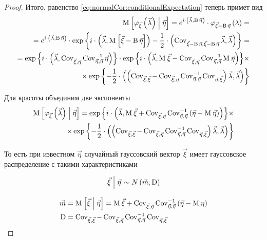 \begin{proof}
  Итого, равенство \ref{eq:normalCor:conditionalExpectation} теперь примет вид
  \begin{align*}
      \Mean{\varphi_{\vec{\xi}}\left( \vec{\lambda} \right) \mcond \vec{\eta}}
      = e^{i \cdot \left( \vec{\lambda}, \operatorname{B} \vec{\eta} \right)}
      \cdot \varphi_{\vec{\xi} - \operatorname{B} \vec{\eta}}\left(
          \lambda \right) = \\
      = e^{i \cdot \left( \vec{\lambda}, \operatorname{B} \vec{\eta} \right)}
      \cdot \exp{\left\{ 
            i \cdot \left( \vec{\lambda},
            \Mean{\vec{\xi} - \operatorname{B} \vec{\eta}} \right)
            - \frac{1}{2} \cdot \left( \dCov{\vec{\xi}
        - \operatorname{B} \vec{\eta}} \vec{\lambda},
        \vec{\lambda} \right)
        \right\}} = \\
      = \exp{\left\{i \cdot \left( \vec{\lambda}, \Cov{\vec{\xi}}{\vec{\eta}}
          \dCov[-1]{\vec{\eta}} \vec{\eta} \right)\right\}}
      \cdot \exp{\left\{ 
            i \cdot \left( \vec{\lambda},
        \mean{\vec{\xi}} - \Cov{\vec{\xi}}{\vec{\eta}}
            \dCov[-1]{\vec{\eta}} \mean{\vec{\eta}} \right)
        \right\}} \times \\
      \times \exp{\left\{ - \frac{1}{2} \cdot \left(
            \left( \dCov{\vec{\xi}} - \Cov{\vec{\xi}}{\vec{\eta}}
        \dCov[-1]{\vec{\eta}} \Cov{\vec{\eta}}{\vec{\xi}}
            \right) \vec{\lambda},
            \vec{\lambda} \right) \right\}}
  \end{align*}

  Для красоты объединим две экспоненты
  \begin{align*}
      \Mean{\varphi_{\vec{\xi}}\left( \vec{\lambda} \right) \mcond \vec{\eta}}
      = \exp{\left\{i \cdot \left( \vec{\lambda},
        \mean{\vec{\xi}} + \Cov{\vec{\xi}}{\vec{\eta}}
            \dCov[-1]{\vec{\eta}} \left(
        \vec{\eta} - \mean{\vec{\eta}} \right) \right)
          \right\}} \times \\
      \times \exp{\left\{- \frac{1}{2} \cdot \left(
            \left( \dCov{\vec{\xi}} - \Cov{\vec{\xi}}{\vec{\eta}}
        \dCov[-1]{\vec{\eta}} \Cov{\vec{\eta}}{\vec{\xi}}
            \right) \vec{\lambda},
            \vec{\lambda} \right)\right\}}
  \end{align*}

  То есть при известном $\vec{\eta}$ случайный гауссовский вектор
  $\vec{\xi}$ имеет гауссовское распределение с такими характеристиками

  $$\left. \vec{\xi} \mcond \vec{\eta} \right. \sim N\left( \vec{m},
      \operatorname{D} \right)$$
  
  \begin{align*}
  \vec{m}
      &= \Mean{\vec{\xi} \mcond \vec{\eta}}
      = \mean{\vec{\xi}} + \Cov{\vec{\xi}}{\vec{\eta}}
      \dCov[-1]{\vec{\eta}}\left( \vec{\eta} - \mean{\eta} \right) \\
  \operatorname{D}
      &= \dCov{\vec{\xi}} - \Cov{\vec{\xi}}{\vec{\eta}} \dCov[-1]{\vec{\eta}}
      \Cov{\vec{\eta}}{\vec{\xi}}
  \end{align*}
\end{proof}

